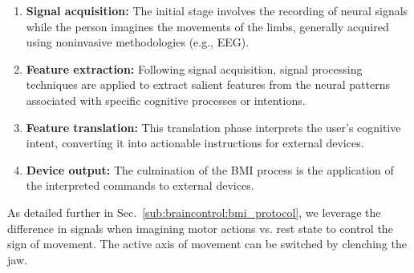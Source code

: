 \begin{enumerate}
    \item \textbf{Signal acquisition:} The initial stage involves the recording of neural signals while the person imagines the movements of the limbs, generally acquired using noninvasive methodologies (e.g., \gls{EEG}).
    \item \textbf{Feature extraction:} Following signal acquisition, signal processing techniques are applied to extract salient features from the neural patterns associated with specific cognitive processes or intentions.
    \item \textbf{Feature translation:} This translation phase interprets the user's cognitive intent, converting it into actionable instructions for external devices.
    \item \textbf{Device output:} The culmination of the \gls{BMI} process is the application of the interpreted commands to external devices. 
\end{enumerate}

As detailed further in Sec.~\ref{sub:braincontrol:bmi_protocol}, we leverage the difference in signals when imagining motor actions vs. rest state to control the sign of movement. The active axis of movement can be switched by clenching the jaw. %


